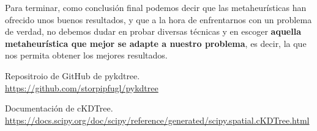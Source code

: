 \documentclass[11pt,a4paper]{article}
\begin{document}
Para terminar, como conclusión final podemos decir que las metaheurísticas han ofrecido unos buenos resultados, y que a la hora
de enfrentarnos con un problema de verdad, no debemos dudar en probar diversas técnicas y en escoger \textbf{aquella 
metaheurística que mejor se adapte a nuestro problema}, es decir, la que nos permita obtener los mejores resultados. 

\newpage

\begin{thebibliography}{5}

Repositroio de GitHub de pykdtree.
\\\url{https://github.com/storpipfugl/pykdtree}

Documentación de cKDTree.
\\\url{https://docs.scipy.org/doc/scipy/reference/generated/scipy.spatial.cKDTree.html}

\end{thebibliography}
\end{document}
